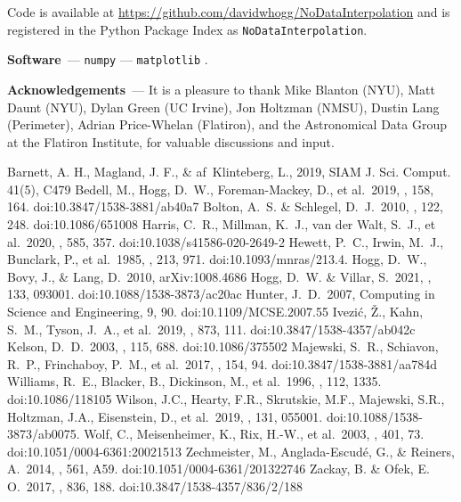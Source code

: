 \documentclass[modern]{aastex631}
\renewcommand{\paragraph}[1]{\medskip\par\noindent\textbf{#1}~---}
\begin{document}
Code is available at \url{https://github.com/davidwhogg/NoDataInterpolation} and is registered in the Python Package Index as \texttt{NoDataInterpolation}.

\paragraph{Software}
\texttt{numpy} \citep{numpy} ---
\texttt{matplotlib} \citep{matplotlib}.

\paragraph{Acknowledgements}
It is a pleasure to thank
Mike Blanton (NYU),
Matt Daunt (NYU),
Dylan Green (UC Irvine),
Jon Holtzman (NMSU), 
Dustin Lang (Perimeter),
Adrian Price-Whelan (Flatiron),
and the Astronomical Data Group at the Flatiron Institute,
for valuable discussions and input.

\begin{thebibliography}{dummy}
Barnett, A. H., Magland, J. F., \& af~Klinteberg, L., 2019, SIAM J. Sci. Comput. 41(5), C479
 Bedell, M., Hogg, D.~W., Foreman-Mackey, D., et al.\ 2019, \aj, 158, 164. doi:10.3847/1538-3881/ab40a7
 Bolton, A.~S. \& Schlegel, D.~J.\ 2010, \pasp, 122, 248. doi:10.1086/651008
 Harris, C.~R., Millman, K.~J., van der Walt, S.~J., et al.\ 2020, \nat, 585, 357. doi:10.1038/s41586-020-2649-2
 Hewett, P.~C., Irwin, M.~J., Bunclark, P., et al.\ 1985, \mnras, 213, 971. doi:10.1093/mnras/213.4.
 Hogg, D.~W., Bovy, J., \& Lang, D.\ 2010, arXiv:1008.4686
 Hogg, D.~W. \& Villar, S.\ 2021, \pasp, 133, 093001. doi:10.1088/1538-3873/ac20ac
 Hunter, J.~D.\ 2007, Computing in Science and Engineering, 9, 90. doi:10.1109/MCSE.2007.55
 Ivezi{\'c}, {\v{Z}}., Kahn, S.~M., Tyson, J.~A., et al.\ 2019, \apj, 873, 111. doi:10.3847/1538-4357/ab042c
 Kelson, D.~D.\ 2003, \pasp, 115, 688. doi:10.1086/375502
 Majewski, S.~R., Schiavon, R.~P., Frinchaboy, P.~M., et al.\ 2017, \aj, 154, 94. doi:10.3847/1538-3881/aa784d
 Williams, R.~E., Blacker, B., Dickinson, M., et al.\ 1996, \aj, 112, 1335. doi:10.1086/118105
 Wilson, J.C., Hearty, F.R., Skrutskie, M.F., Majewski, S.R., Holtzman, J.A., Eisenstein, D., et al.\ 2019, \pasp, 131, 055001. doi:10.1088/1538-3873/ab0075.
 Wolf, C., Meisenheimer, K., Rix, H.-W., et al.\ 2003, \aap, 401, 73. doi:10.1051/0004-6361:20021513
 Zechmeister, M., Anglada-Escud{\'e}, G., \& Reiners, A.\ 2014, \aap, 561, A59. doi:10.1051/0004-6361/201322746
 Zackay, B. \& Ofek, E. O.\ 2017, \apj, 836, 188. doi:10.3847/1538-4357/836/2/188


\end{thebibliography}
\end{document}
